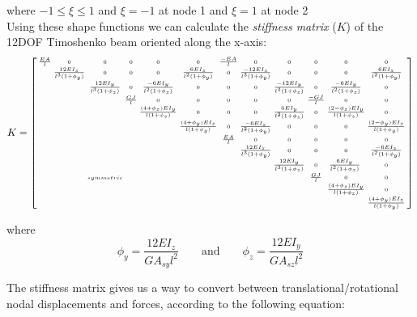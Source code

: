 {where $-1 \leq \xi \leq 1$ and $\xi = -1$ at node 1 and $\xi = 1$ at node 2\\

Using these shape functions we can calculate the \textit{stiffness matrix} ($K$) of the 12DOF Timoshenko beam oriented along the x-axis:\\

\[ K =  \scriptsize {\left[ \begin{smallmatrix}
\tfrac{EA}{l} & 0 & 0 & 0 & 0 & 0 & \tfrac{-EA}{l} & 0 & 0 & 0 & 0 & 0\\
 & \tfrac{12EI_z}{l^3(1+\phi_y)} & 0 & 0 & 0 & \tfrac{6EI_z}{l^2(1+\phi_y)} & 0 & \tfrac{-12EI_z}{l^3(1+\phi_y)} & 0 & 0 & 0 & \tfrac{6EI_z}{l^2(1+\phi_y)}\\
 &  & \tfrac{12EI_y}{l^3(1+\phi_z)} & 0 & \tfrac{-6EI_y}{l^2(1+\phi_z)} & 0 & 0 & 0 & \tfrac{-12EI_y}{l^3(1+\phi_z)} & 0 & \tfrac{-6EI_y}{l^2(1+\phi_z)} & 0\\
 &  &  &  \tfrac{GJ}{l} &  0 &  0 &  0 &  0 &  0 & \tfrac{-GJ}{l} & 0 & 0\\
 &  &  &  & \tfrac{(4+\phi_z)EI_y}{l(1+\phi_z)} & 0 & 0 & 0 & \tfrac{6EI_y}{l^2(1+\phi_z)} & 0 & \tfrac{(2-\phi_z)EI_y}{l(1+\phi_z)} & 0\\
 &  &  &  &  & \tfrac{(4+\phi_y)EI_z}{l(1+\phi_y)} & 0 & \tfrac{-6EI_z}{l^2(1+\phi_y)} & 0 & 0 & 0 & \tfrac{(2-\phi_y)EI_z}{l(1+\phi_y)}\\
 &  &  &  &  &  & \tfrac{EA}{l}  & 0 & 0 & 0 & 0 & 0\\
 &  &  &  &  &  &  & \tfrac{12EI_z}{l^3(1+\phi_y)} & 0 & 0 & 0 & \tfrac{-6EI_z}{l^2(1+\phi_y)}\\
 &  &  &  &  &  &  &  & \tfrac{12EI_y}{l^3(1+\phi_z)} & 0 & \tfrac{6EI_y}{l^2(1+\phi_z)}\ & 0\\
 &  & symmetric &  &  &  &  &  &  & \tfrac{GJ}{l} & 0 & 0\\
 &  &  &  &  &  &  &  &  &  & \tfrac{(4+\phi_z)EI_y}{l(1+\phi_z)} & 0\\
  &  &  &  &  &  &  &  &  &  &  & \tfrac{(4+\phi_y)EI_z}{l(1+\phi_y)}\\
 \end{smallmatrix} \right] }\]
 
 where
\[ \phi_y = \dfrac{12EI_z}{GA_{sy}l^2} \qquad  \textrm{and} \qquad \phi_z = \dfrac{12EI_y}{GA_{sz}l^2} \]


The stiffness matrix gives us a way to convert between translational/rotational nodal displacements and forces, according to the following equation:

}
